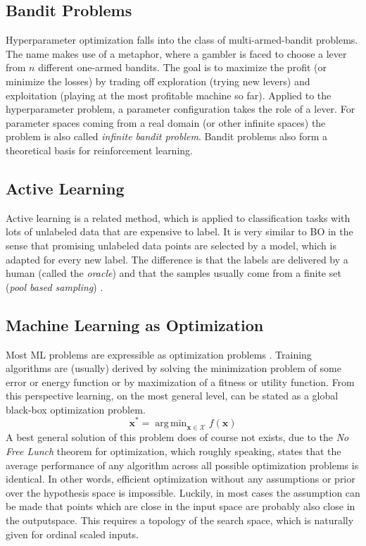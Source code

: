 \documentclass[english]{article}
\newcommand{\x}{\mathbf{x}}
\DeclareMathOperator*{\argmin}{arg\,min}
\begin{document}
\subsection{Bandit Problems}
Hyperparameter optimization falls into the class of multi-armed-bandit problems. The name makes use of a metaphor, where a gambler is faced to choose a lever from $n$ different one-armed bandits. The goal is to maximize the profit (or minimize the losses) by trading off exploration (trying new levers) and exploitation (playing at the most profitable machine so far). Applied to the hyperparameter problem, a parameter configuration takes the role of a lever. For parameter spaces coming from a real domain (or other infinite spaces) the problem is also called \textit{infinite bandit problem}. Bandit problems also form a theoretical basis for reinforcement learning.



\subsection{Active Learning}
Active learning is a related method, which is applied to classification tasks with lots of unlabeled data that are expensive to label. It is very similar to BO in the sense that promising unlabeled data points are selected by a model, which is adapted for every new label. The difference is that the labels are delivered by a human (called the \textit{oracle}) and that the samples usually come from a finite set (\textit{pool based sampling}) \cite{settles_active_2010}.

\subsection{Machine Learning as Optimization}
Most ML problems are expressible as optimization problems \cite{bennett_interplay_2006}. Training algorithms are (usually) derived by solving the minimization problem of some error or energy function or by maximization of a fitness or utility function. From this perspective learning, on the most general level, can be stated as a global black-box optimization problem.
$$\x^* = \argmin_{\x \in \mathcal{X}} f(\x)$$
A best general solution of this problem does of course not exists, due to the \textit{No Free Lunch} theorem for optimization, which roughly speaking, states that the average performance of any algorithm across all possible optimization problems is identical. In other words, efficient optimization without any assumptions or prior over the hypothesis space is impossible. Luckily, in most cases the assumption can be made that points which are close in the input space are probably also close in the outputspace. This requires a topology of the search space, which is naturally given for ordinal scaled inputs.
\end{document}
